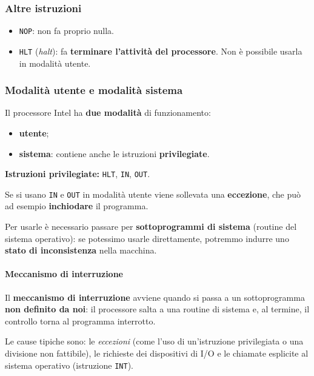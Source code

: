 \documentclass[11pt,a4paper]{article}
\begin{document}
\subsubsection*{Altre istruzioni}

\begin{itemize}[leftmargin=*]
  \item \texttt{NOP}: non fa proprio nulla.
  \item \texttt{HLT} (\emph{halt}): fa \textbf{terminare l'attività del processore}. Non è possibile usarla in modalità utente.
\end{itemize}

\subsubsection*{Modalità utente e modalità sistema}

Il processore Intel ha \textbf{due modalità} di funzionamento:
\begin{itemize}[leftmargin=*]
  \item \textbf{utente};
  \item \textbf{sistema}: contiene anche le istruzioni \textbf{privilegiate}.
\end{itemize}

\textbf{Istruzioni privilegiate:} \texttt{HLT}, \texttt{IN}, \texttt{OUT}.

Se si usano \texttt{IN} e \texttt{OUT} in modalità utente viene sollevata una \textbf{eccezione}, che può ad esempio \textbf{inchiodare} il programma.

Per usarle è necessario passare per \textbf{sottoprogrammi di sistema} (routine del sistema operativo): se potessimo usarle direttamente, potremmo indurre uno \textbf{stato di inconsistenza} nella macchina.

\paragraph*{Meccanismo di interruzione}

Il \textbf{meccanismo di interruzione} avviene quando si passa a un sottoprogramma \textbf{non definito da noi}: il processore salta a una routine di sistema e, al termine, il controllo torna al programma interrotto.

\begin{integrazione}
Le cause tipiche sono: le \emph{eccezioni} (come l'uso di un'istruzione privilegiata o una divisione non fattibile), le richieste dei dispositivi di I/O e le chiamate esplicite al sistema operativo (istruzione \texttt{INT}).
\end{integrazione}
\end{document}

